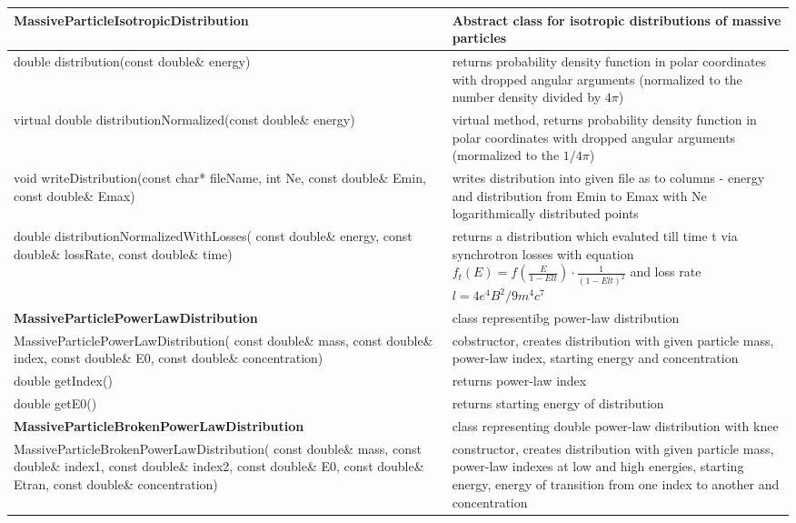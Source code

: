 \begin{small}
	\label{MassiveParticleMethods}
	\begin{xtabular}{|p{0.57\textwidth}|p{0.43\textwidth}|}				
		\hline
		\textbf{MassiveParticleIsotropicDistribution} & Abstract class for isotropic distributions of massive particles\\
		\hline
		double distribution(const double\& energy) & returns probability density function in polar coordinates with dropped angular arguments (normalized to the number density divided by $4\pi$)\\
		\hline
		virtual double distributionNormalized(const double\& energy) & virtual method, returns probability density function in polar coordinates with dropped angular arguments (mormalized to the $1/4\pi$)\\
		\hline
		void writeDistribution(const char* fileName, int Ne, const double\& Emin, const double\& Emax) &writes distribution into given file as to columns - energy and distribution from Emin to Emax with Ne logarithmically distributed points\\
		\hline
		double distributionNormalizedWithLosses( const double\& energy, const double\& lossRate, const double\& time) & returns a distribution which evaluted till time t via synchrotron losses with equation $f_t(E)=f\left(\frac{E}{1-E l t}\right)\cdot\frac{1}{\left(1- E l t\right)^2}$ and loss rate $l = 4e^4 B^2 /9m^4 c^7$\\
		\hline
		\textbf{MassiveParticlePowerLawDistribution} & class representibg power-law distribution\\
		\hline
		MassiveParticlePowerLawDistribution( const double\& mass, const double\& index, const double\& E0, const double\& concentration) & cobstructor, creates distribution with given particle mass, power-law index, starting energy and concentration\\
		\hline
		double getIndex() &returns power-law index\\
		\hline
		double getE0() & returns starting energy of distribution\\
		\hline
		\textbf{MassiveParticleBrokenPowerLawDistribution} & class representing double power-law distribution with knee\\
		\hline
		MassiveParticleBrokenPowerLawDistribution( const double\& mass, const double\& index1, const double\& index2, const double\& E0, const double\& Etran, const double\& concentration) & constructor, creates distribution with given particle mass, power-law indexes at low and high energies, starting energy, energy of transition from one index to another and concentration\\

\end{xtabular}
\end{small}
